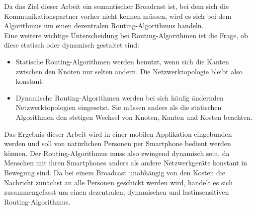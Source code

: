 Da das Ziel dieser Arbeit ein semantischer Broadcast ist, bei dem sich die Kommunikationspartner vorher nicht kennen müssen, wird es sich bei dem Algorithmus um einen dezentralen Routing-Algorithmus handeln.
\\Eine weitere wichtige Unterscheidung bei Routing-Algorithmen ist die Frage, ob diese statisch oder dynamisch gestaltet sind:
\begin{itemize}
	\item Statische Routing-Algorithmen werden benutzt, wenn sich die Kanten zwischen den Knoten nur selten ändern. Die Netzwerktopologie bleibt also konstant.
	\item Dynamische Routing-Algorithmen werden bei sich häufig ändernden Netzwerktopologien eingesetzt. Sie müssen anders als die statischen Algorithmen den stetigen Wechsel von Knoten, Kanten und Kosten beachten.
\end{itemize}
Das Ergebnis dieser Arbeit wird in einer mobilen Applikation eingebunden werden und soll von natürlichen Personen per Smartphone bedient werden können. Der Routing-Algorithmus muss also zwingend dynamisch sein, da Menschen mit ihren Smartphones anders als andere Netzwerkgeräte konstant in Bewegung sind. Da bei einem Broadcast unabhängig von den Kosten die Nachricht zunächst an alle Personen geschickt werden wird, handelt es sich zusammengefasst um einen dezentralen, dynamischen und lastinsensitiven Routing-Algorithmus. 

